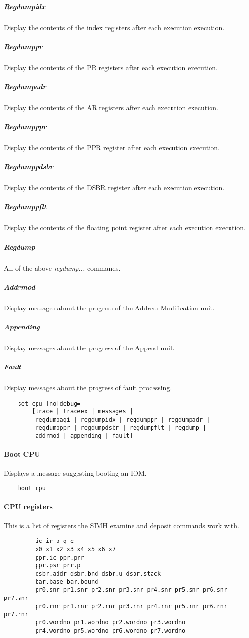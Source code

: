 \documentclass[notitlepage]{report}
\begin{document}
\subparagraph{Regdumpidx}
Display the contents of the index registers after each execution execution.

\subparagraph{Regdumppr}
Display the contents of the PR registers after each execution execution.

\subparagraph{Regdumpadr}
Display the contents of the AR registers after each execution execution.

\subparagraph{Regdumpppr}
Display the contents of the PPR register after each execution execution.

\subparagraph{Regdumppdsbr}
Display the contents of the DSBR register after each execution execution.

\subparagraph{Regdumppflt}
Display the contents of the floating point register after each execution execution.

\subparagraph{Regdump}
All of the above \textit{regdump...} commands.

\subparagraph{Addrmod}
Display messages about the progress of the Address Modification unit.

\subparagraph{Appending}
Display messages about the progress of the Append unit.

\subparagraph{Fault}
Display messages about the progress of fault processing.

\begin{lstlisting}
	set cpu [no]debug=
		[trace | traceex | messages |
		 regdumpaqi | regdumpidx | regdumppr | regdumpadr |
		 regdumpppr | regdumpdsbr | regdumpflt | regdump |
		 addrmod | appending | fault]
\end{lstlisting}

\paragraph{Boot CPU}
Displays a message suggesting booting an IOM.

\begin{lstlisting}
	boot cpu
\end{lstlisting}

\paragraph{CPU registers}
This is a list of registers the SIMH examine and deposit commands work with.

\begin{lstlisting}
	     ic ir a q e 
	     x0 x1 x2 x3 x4 x5 x6 x7
	     ppr.ic ppr.prr
	     ppr.psr prr.p
	     dsbr.addr dsbr.bnd dsbr.u dsbr.stack
	     bar.base bar.bound
	     pr0.snr pr1.snr pr2.snr pr3.snr pr4.snr pr5.snr pr6.snr pr7.snr
	     pr0.rnr pr1.rnr pr2.rnr pr3.rnr pr4.rnr pr5.rnr pr6.rnr pr7.rnr
	     pr0.wordno pr1.wordno pr2.wordno pr3.wordno
	     pr4.wordno pr5.wordno pr6.wordno pr7.wordno
\end{lstlisting}
\end{document}
